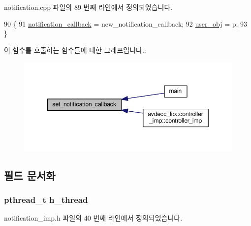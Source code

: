notification.\+cpp 파일의 89 번째 라인에서 정의되었습니다.


\begin{DoxyCode}
90 \{
91     \hyperlink{classavdecc__lib_1_1notification_a0aaf6a2e3f6d6e3fb6b416e9c2f7f6e9}{notification\_callback} = new\_notification\_callback;
92     \hyperlink{classavdecc__lib_1_1notification_af3646c45b560aeab38e708886dec0d93}{user\_obj} = p;
93 \}
\end{DoxyCode}


이 함수를 호출하는 함수들에 대한 그래프입니다.\+:
\nopagebreak
\begin{figure}[H]
\begin{center}
\leavevmode
\includegraphics[width=349pt]{classavdecc__lib_1_1notification_abdf19db77644e724db59c66a2cf7c5fb_icgraph}
\end{center}
\end{figure}




\subsection{필드 문서화}
\subsubsection[{\texorpdfstring{h\+\_\+thread}{h_thread}}]{\setlength{\rightskip}{0pt plus 5cm}pthread\+\_\+t h\+\_\+thread\hspace{0.3cm}{\ttfamily [private]}}\hypertarget{classavdecc__lib_1_1notification__imp_a6e4816698fce9da1e93d69ecbcc78506}{}\label{classavdecc__lib_1_1notification__imp_a6e4816698fce9da1e93d69ecbcc78506}


notification\+\_\+imp.\+h 파일의 40 번째 라인에서 정의되었습니다.


